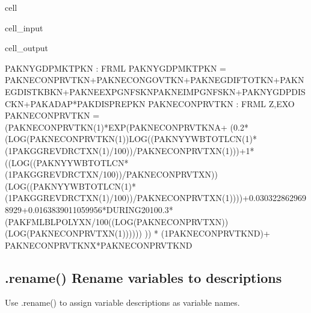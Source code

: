 \documentclass[letterpaper,10pt,english]{jupyterBook}
\begin{document}
\begin{sphinxuseclass}{cell}\begin{sphinxVerbatimInput}

\begin{sphinxuseclass}{cell_input}
\begin{sphinxVerbatim}[commandchars=\\\{\}]
\PYG{p}{[}\PYG{p}{]}
\end{sphinxVerbatim}

\end{sphinxuseclass}\end{sphinxVerbatimInput}
\begin{sphinxVerbatimOutput}

\begin{sphinxuseclass}{cell_output}
\begin{sphinxVerbatim}[commandchars=\\\{\}]
PAKNYGDPMKTPKN : FRML \PYGZlt{}\PYGZgt{} PAKNYGDPMKTPKN = PAKNECONPRVTKN+PAKNECONGOVTKN+PAKNEGDIFTOTKN+PAKNEGDISTKBKN+PAKNEEXPGNFSKN\PYGZhy{}PAKNEIMPGNFSKN+PAKNYGDPDISCKN+PAKADAP*PAKDISPREPKN \PYGZdl{}
PAKNECONPRVTKN : FRML \PYGZlt{}Z,EXO\PYGZgt{} PAKNECONPRVTKN = (PAKNECONPRVTKN(\PYGZhy{}1)*EXP(\PYGZhy{}PAKNECONPRVTKN\PYGZus{}A+ (\PYGZhy{}0.2*(LOG(PAKNECONPRVTKN(\PYGZhy{}1))\PYGZhy{}LOG((PAKNYYWBTOTLCN(\PYGZhy{}1)*(1\PYGZhy{}PAKGGREVDRCTXN(\PYGZhy{}1)/100))/PAKNECONPRVTXN(\PYGZhy{}1)))+1*((LOG((PAKNYYWBTOTLCN*(1\PYGZhy{}PAKGGREVDRCTXN/100))/PAKNECONPRVTXN))\PYGZhy{}(LOG((PAKNYYWBTOTLCN(\PYGZhy{}1)*(1\PYGZhy{}PAKGGREVDRCTXN(\PYGZhy{}1)/100))/PAKNECONPRVTXN(\PYGZhy{}1))))+0.0303228629698929+0.0163839011059956*DURING\PYGZus{}2010\PYGZhy{}0.3*(PAKFMLBLPOLYXN/100\PYGZhy{}((LOG(PAKNECONPRVTXN))\PYGZhy{}(LOG(PAKNECONPRVTXN(\PYGZhy{}1)))))) )) * (1\PYGZhy{}PAKNECONPRVTKN\PYGZus{}D)+ PAKNECONPRVTKN\PYGZus{}X*PAKNECONPRVTKN\PYGZus{}D \PYGZdl{}
\end{sphinxVerbatim}

\end{sphinxuseclass}\end{sphinxVerbatimOutput}

\end{sphinxuseclass}

\subsection{.rename() Rename variables to descriptions}
\label{\detokenize{content/Python/modelflow_features:rename-rename-variables-to-descriptions}}
\sphinxAtStartPar
Use .rename() to assign variable descriptions as variable names.
\end{document}
